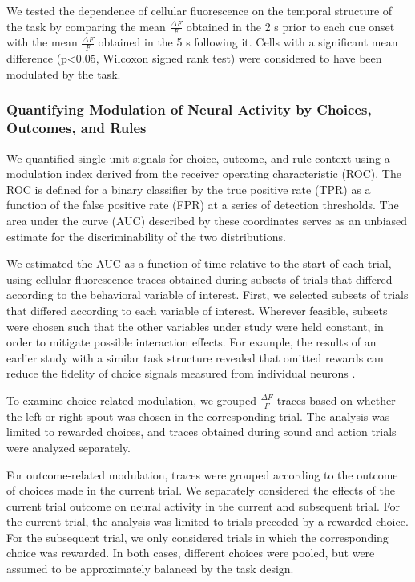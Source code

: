 We tested the dependence of cellular fluorescence on the temporal structure of the task by comparing the mean $\frac{\Delta F}{F}$ obtained in the 2 s prior to each cue onset with the mean $\frac{\Delta F}{F}$ obtained in the 5 s following it. Cells with a significant mean difference (p<0.05, Wilcoxon signed rank test) were considered to have been modulated by the task.

\subsubsection*{Quantifying Modulation of Neural Activity by Choices, Outcomes, and Rules}
\hypertarget{methods_ROC}{}

We quantified single-unit signals for choice, outcome, and rule context using a modulation index derived from the receiver operating characteristic (ROC). The ROC is defined for a binary classifier by the true positive rate (TPR) as a function of the false positive rate (FPR) at a series of detection thresholds. The area under the curve (AUC) described by these coordinates serves as an unbiased estimate for the discriminability of the two distributions.

We estimated the AUC as a function of time relative to the start of each trial, using cellular fluorescence traces obtained during subsets of trials that differed according to the behavioral variable of interest. First, we selected subsets of trials that differed according to each variable of interest. Wherever feasible, subsets were chosen such that the other variables under study were held constant, in order to mitigate possible interaction effects. For example, the results of an earlier study with a similar task structure revealed that omitted rewards can reduce the fidelity of choice signals measured from individual neurons \citep{siniscalchi2019enhanced}. 

To examine choice-related modulation, we grouped $\frac{\Delta F}{F}$ traces based on whether the left or right spout was chosen in the corresponding trial. The analysis was limited to rewarded choices, and traces obtained during sound and action trials were analyzed separately. 

For outcome-related modulation, traces were grouped according to the outcome of choices made in the current trial. We separately considered the effects of the current trial outcome on neural activity in the current and subsequent trial. For the current trial, the analysis was limited to trials preceded by a rewarded choice. For the subsequent trial, we only considered trials in which the corresponding choice was rewarded. In both cases, different choices were pooled, but were assumed to be approximately balanced by the task design.

